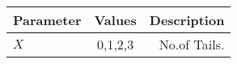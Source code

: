 \begin{tabular}{|l|c|r|}
    \hline
    Parameter & Values & Description\\
    \hline
    $X $ & 0,1,2,3 & No.of Tails.\\
    \hline
\end{tabular}
